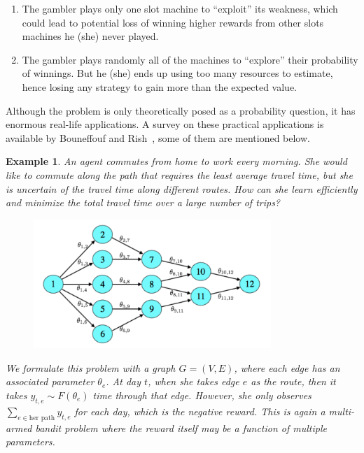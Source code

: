 \documentclass[11pt]{article}
\newtheorem{example}{Example}
\begin{document}
\begin{enumerate}
    \item The gambler plays only one slot machine to ``exploit'' its weakness, which could lead to potential loss of winning higher rewards from other slots machines he (she) never played.
    \item The gambler plays randomly all of the machines to ``explore'' their probability of winnings. But he (she) ends up using too many resources to estimate, hence losing any strategy to gain more than the expected value.
\end{enumerate}

Although the problem is only theoretically posed as a probability question, it has enormous real-life applications. A survey on these practical applications is available by Bouneffouf and Rish~\cite{bouneffouf2019survey}, some of them are mentioned below.

\begin{example}\label{example:1}
    An agent commutes from home to work every morning. She would like to commute along the path that requires the least average travel time, but she is uncertain of the travel time along different routes. How can she learn efficiently and minimize the total travel time over a large number of trips?

    \begin{figure}[ht]
        \centering
        \includegraphics[width = 0.8\textwidth]{travel-example.png}
    \end{figure}

    We formulate this problem with a graph $G = (V, E)$, where each edge has an associated parameter $\theta_{e}$. At day $t$, when she takes edge $e$ as the route, then it takes $y_{t, e} \sim F(\theta_e)$ time through that edge. However, she only observes $\sum_{e \in \text{her path}} y_{t, e}$ for each day, which is the negative reward. This is again a multi-armed bandit problem where the reward itself may be a function of multiple parameters.
\end{example}
\end{document}
